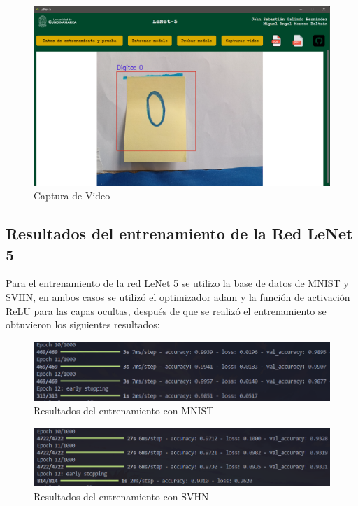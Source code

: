\begin{itemize}
    \begin{figure}[H]
        \centering
        \includegraphics[width=\linewidth]{src/figures/real_test_image_0.png}
        \caption{Captura de Video}
        \label{fig:VideoCapture}
    \end{figure}
\end{itemize}

\subsection{Resultados del entrenamiento de la Red LeNet 5}
Para el entrenamiento de la red LeNet 5 se utilizo la base de datos de MNIST y SVHN, en ambos casos se
utilizó el optimizador adam y la función de activación ReLU para las capas ocultas, después de que 
se realizó el entrenamiento se obtuvieron los siguientes resultados:

\begin{figure}[htbp]
    \centering
    \includegraphics[width=1.1\linewidth]{src/figures/mnist_training.png}
    \caption{Resultados del entrenamiento con MNIST}
    \label{fig:MNISTResults}
\end{figure}

\begin{figure}[htbp]
    \centering
    \includegraphics[width=1.1\linewidth]{src/figures/lenet_training.png}
    \caption{Resultados del entrenamiento con SVHN}
    \label{fig:SVHNResults}
\end{figure}

